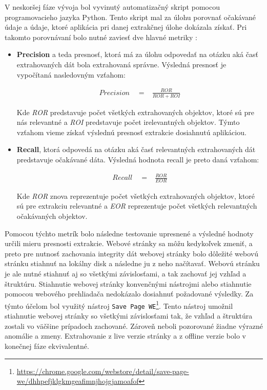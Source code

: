 V neskoršej fáze vývoja bol vyvinutý automatizačný skript pomocou programovacieho jazyka Python. Tento skript mal za úlohu porovnať očakávané údaje a údaje, ktoré aplikácia pri danej extrakčnej úlohe dokázala získať. Pri takomto porovnávaní bolo nutné zaviesť dve hlavné metriky \cite{precrecall}:

\begin{itemize}
    \item \textbf{Precision} a teda presnosť, ktorá má za úlohu odpovedať na otázku aká časť extrahovaných dát bola extrahovaná správne. Výsledná presnosť je vypočítaná nasledovným vzťahom:
    
    \begin{eqnarray}
    \label{preeq}
    Precision \quad = & {\displaystyle\frac{ROR}{ROR + ROI}}
    \end{eqnarray}
   
    Kde \textit{ROR} predstavuje počet všetkých extrahovaných objektov, ktoré sú pre nás relevantné a \textit{ROI} predstavuje počet irelevantných objektov. Týmto vzťahom vieme získať výslednú presnosť extrakcie dosiahnutú aplikáciou.
    
    \item \textbf{Recall}, ktorá odpovedá na otázku aká časť relevantných extrahovaných dát predstavuje očakávané dáta. Výsledná hodnota recall je preto daná vzťahom:
    
    \begin{eqnarray}
    \label{receq}
    Recall \quad = & {\displaystyle\frac{ROR}{EOR}}
    \end{eqnarray}
    
    Kde \textit{ROR} znova reprezentuje počet všetkých extrahovaných objektov, ktoré sú pre extrakciu relevantné a \textit{EOR} reprezentuje počet všetkých relevantných očakávaných objektov.
\end{itemize}

\bigskip

Pomocou týchto metrík bolo následne testovanie upresnené a výsledné hodnoty určili mieru presnosti extrakcie. Webové stránky sa môžu kedykoľvek zmeniť, a preto pre nutnosť zachovania integrity dát webovej stránky bolo dôležité webovú stránku stiahnuť na lokálny disk a následne ju z neho načítavať. Webovú stránku je ale nutné stiahnuť aj so všetkými závislosťami, a tak zachovať jej vzhľad a štruktúru. Stiahnutie webovej stránky konvenčnými nástrojmi alebo stiahnutie pomocou webového prehliadača nedokázalo dosiahnuť požadované výsledky. Za týmto účelom bol využitý nástroj \texttt{Save Page WE}\footnote{\url{https://chrome.google.com/webstore/detail/save-page-we/dhhpefjklgkmgeafimnjhojgjamoafof}}. Tento nástroj umožnil stiahnutie webovej stránky so všetkými závislosťami tak, že vzhľad a štruktúra zostali vo väčšine prípadoch zachované. Zároveň neboli pozorované žiadne výrazné anomálie a zmeny. Extrahovanie z live verzie stránky a z offline verzie bolo v konečnej fáze ekvivalentné. 

